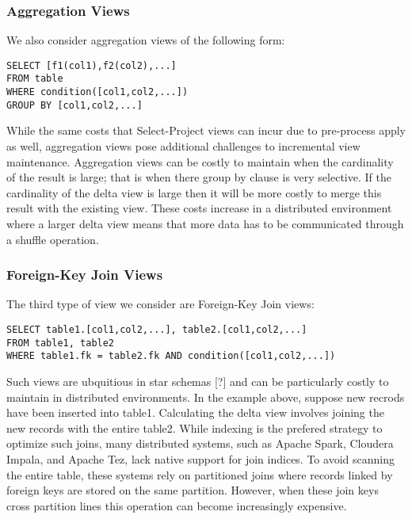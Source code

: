 



\subsubsection{Aggregation Views}

We also consider aggregation views of the following form:

\begin{lstlisting}
SELECT [f1(col1),f2(col2),...] 
FROM table 
WHERE condition([col1,col2,...]) 
GROUP BY [col1,col2,...]
\end{lstlisting}


While the same costs that Select-Project views can incur due to pre-process
apply as well, aggregation views pose additional challenges to incremental
view maintenance. Aggregation views can be costly to maintain when
the cardinality of the result is large; that is when there group by
clause is very selective. If the cardinality of the delta view is
large then it will be more costly to merge this result with the existing
view. These costs increase in a distributed environment where a larger
delta view means that more data has to be communicated through a shuffle
operation. 


\subsubsection{Foreign-Key Join Views}

The third type of view we consider are Foreign-Key Join views:

\begin{lstlisting}
SELECT table1.[col1,col2,...], table2.[col1,col2,...]
FROM table1, table2 
WHERE table1.fk = table2.fk AND condition([col1,col2,...]) 
\end{lstlisting}


Such views are ubquitious in star schemas {[}?{]} and can be particularly
costly to maintain in distributed environments. In the example above,
suppose new recrods have been inserted into table1. Calculating the
delta view involves joining the new records with the entire table2.
While indexing is the prefered strategy to optimize such joins, many
distributed systems, such as Apache Spark, Cloudera Impala, and Apache
Tez, lack native support for join indices. To avoid scanning the entire
table, these systems rely on partitioned joins where records linked
by foreign keys are stored on the same partition. However, when these
join keys cross partition lines this operation can become increasingly
expensive.


